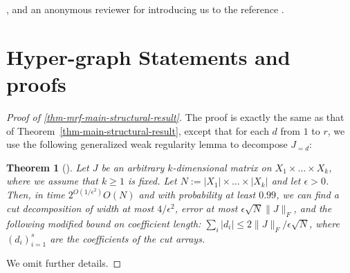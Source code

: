 \documentclass[final, 12pt]{colt2018}
\newtheorem{theorem}{Theorem}[section]
\theoremstyle{definition}
\theoremstyle{plain}
\begin{document}
, and an anonymous reviewer for introducing us to the reference \citep{eldan2016gaussian}. 
 
%


\appendix

\section{Hyper-graph Statements and proofs}
\label{sec-hypergraph}

\begin{proof}[Proof of \cref{thm-mrf-main-structural-result}]
The proof is exactly the same as that of Theorem~\ref{thm-main-structural-result},
except that for each $d$ from $1$ to $r$, we use the following generalized
weak regularity lemma to decompose $J_{=d}$:
\begin{theorem}[\citet{alon-etal-samplingCSP-journal}]\label{reg-alon-etal-mrf}
Let $J$ be an arbitrary $k$-dimensional matrix on $X_{1}\times\dots\times X_{k}$,
where we assume that $k\geq 1$ is fixed. Let $N:=|X_{1}|\times\dots\times|X_{k}|$
and let $\epsilon>0$. Then, in time $2^{O(1/\epsilon^{2})}O(N)$
and with probability at least $0.99$, we can find a cut decomposition of
width at most $4/\epsilon^{2}$, error at most $\epsilon\sqrt{N}\|J\|_F$,
and the following modified bound on coefficient length: $\sum_i |d_i| \le 2\|J\|_F/\epsilon\sqrt{N}$, where $(d_i)_{i =1}^s$ are the coefficients of
the cut arrays.
\end{theorem}

We omit further details. 
\end{proof}
\end{document}
